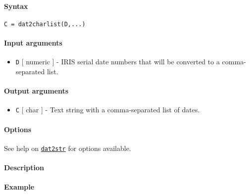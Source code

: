 


	\paragraph{Syntax}\label{syntax}

\begin{verbatim}
C = dat2charlist(D,...)
\end{verbatim}

\paragraph{Input arguments}\label{input-arguments}

\begin{itemize}
\itemsep1pt\parskip0pt
\item
  \texttt{D} {[} numeric {]} - IRIS serial date numbers that will be
  converted to a comma-separated list.
\end{itemize}

\paragraph{Output arguments}\label{output-arguments}

\begin{itemize}
\itemsep1pt\parskip0pt
\item
  \texttt{C} {[} char {]} - Text string with a comma-separated list of
  dates.
\end{itemize}

\paragraph{Options}\label{options}

See help on \href{dates/dat2str}{\texttt{dat2str}} for options
available.

\paragraph{Description}\label{description}

\paragraph{Example}\label{example}


